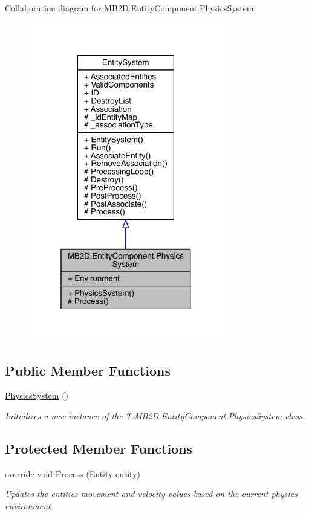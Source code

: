 Collaboration diagram for M\+B2\+D.\+Entity\+Component.\+Physics\+System\+:
\nopagebreak
\begin{figure}[H]
\begin{center}
\leavevmode
\includegraphics[width=241pt]{class_m_b2_d_1_1_entity_component_1_1_physics_system__coll__graph}
\end{center}
\end{figure}
\subsection*{Public Member Functions}
\begin{DoxyCompactItemize}
\item 
\hyperlink{class_m_b2_d_1_1_entity_component_1_1_physics_system_a3ab72aac19449619200d2353572b28b0}{Physics\+System} ()
\begin{DoxyCompactList}\small\item\em Initializes a new instance of the T\+:\+M\+B2\+D.\+Entity\+Component.\+Physics\+System class. \end{DoxyCompactList}\end{DoxyCompactItemize}
\subsection*{Protected Member Functions}
\begin{DoxyCompactItemize}
\item 
override void \hyperlink{class_m_b2_d_1_1_entity_component_1_1_physics_system_ab8398d3b16f49e684f55649877f645c0}{Process} (\hyperlink{class_m_b2_d_1_1_entity_component_1_1_entity}{Entity} entity)
\begin{DoxyCompactList}\small\item\em Updates the entities movement and velocity values based on the current physics environment \end{DoxyCompactList}\end{DoxyCompactItemize}
